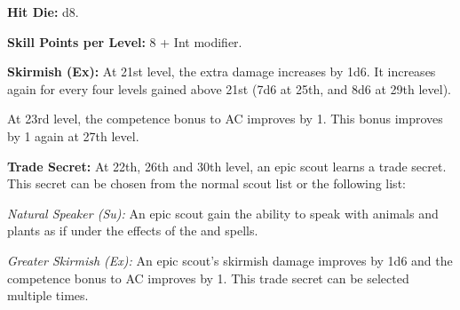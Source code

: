 
\MiniWarriorTable{The Epic Scout}{
21 & +15/+10/+5        & +7  & +12 & +7  & Skirmish ~~~~~~ (+6d6/+5 AC)\\
22 & +16/+11/+6/+1     & +7  & +13 & +7  & Trade secret\\
23 & +17/+12/+7/+2     & +7  & +13 & +7  & Skirmish ~~~~~~ (+6d6/+6 AC)\\
24 & +18/+13/+8/+3     & +8  & +14 & +8  & Bonus feat\\
25 & +18/+13/+8/+3     & +8  & +14 & +8  & Special ability, skirmish ~~~~~~ (+7d6/+6 AC)\\
26 & +19/+14/+9/+4     & +8  & +15 & +8  & Trade secret\\
27 & +20/+15/+10/+5    & +9  & +15 & +9  & Skirmish ~~~~~~ (+7d6/+7 AC)\\
28 & +21/+16/+11/+6/+1 & +9  & +16 & +9  & Bonus feat\\
29 & +21/+16/+11/+6/+1 & +9  & +16 & +9  & Skirmish ~~~~~~ (+8d6/+7 AC)\\
30 & +22/+17/+12/+7/+2 & +10 & +17 & +10 & Special ability, trade secret\\
}

\textbf{Hit Die:} d8.

\textbf{Skill Points per Level:} 8 + Int modifier.

\textbf{Skirmish (Ex):} At 21st level, the extra damage increases by 1d6. It increases again for every four levels gained above 21st (7d6 at 25th, and 8d6 at 29th level).

At 23rd level, the competence bonus to AC improves by 1. This bonus improves by 1 again at 27th level.

\textbf{Trade Secret:} At 22th, 26th and 30th level, an epic scout learns a trade secret. This secret can be chosen from the normal scout list or the following list:

\textit{Natural Speaker (Su):} An epic scout gain the ability to speak with animals and plants as if under the effects of the  and  spells.

\textit{Greater Skirmish (Ex):} An epic scout's skirmish damage improves by 1d6 and the competence bonus to AC improves by 1. This trade secret can be selected multiple times.

